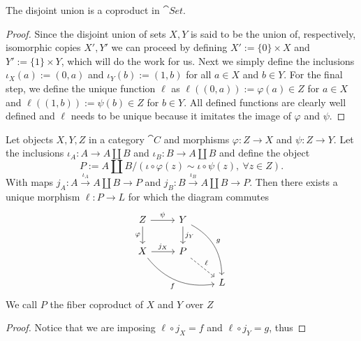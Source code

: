 \begin{proposition}
   The disjoint union is a coproduct in \(\cat{Set}\).
\end{proposition}

\begin{proof}
    Since the disjoint union of sets \(X, Y\) is said to be the union of,
    respectively, isomorphic copies \(X', Y'\) we can proceed by defining  \(X'
    := \{0\} \times X\) and \(Y' := \{1\} \times Y\), which will do the work
    for us. Next we simply define the inclusions \(\iota_X(a) := (0, a)\) and
    \(\iota_Y(b) := (1, b)\) for all \(a \in X\) and \(b \in Y\). For the final
    step, we define the unique function \(\ell\) as \(\ell((0,a)) := \varphi(a)
    \in Z\) for \(a \in X\) and \(\ell((1, b)) := \psi(b) \in Z\)  for \(b \in
    Y\). All defined functions are clearly well defined and \(\ell\) needs to be
    unique because it imitates the image of \(\varphi\) and \(\psi\).
\end{proof}

\begin{proposition}
   Let objects \(X, Y, Z\) in a category \(\cat C\) and morphisms \(\varphi : Z
   \to X\) and \(\psi : Z \to Y\). Let the inclusions \(\iota_A : A \to A \amalg
   B\) and  \(\iota_B: B \to A \amalg B\) and define the object 
    \[
       P := A \amalg B / (\iota \circ \varphi(z) \sim \iota \circ \psi(z),\
       \forall z \in Z).
   \] 
   With maps \(j_A : A \xrightarrow{\iota_A} A \amalg B \to P\) and  \(j_B : B
   \xrightarrow{\iota_B} A \amalg B \to P\). Then there exists a unique morphism
    \(\ell : P \to L\) for which the diagram commutes
     \[
       \begin{tikzcd}
         Z
         \ar[r, "\psi"]
         \ar[d, swap, "\varphi"]
           &Y
           \ar[d, "j_Y"]
           \ar[ddr, bend left, "g"]
             &\\
         X
         \ar[r, "j_X"]
         \ar[drr, bend right, swap, "f"]
           &P
           \ar[dr, dashed, "\ell"]
             &\\
           &
             &L
       \end{tikzcd}
    \] 
    We call \(P\) the fiber coproduct of \(X\) and \(Y\) over \(Z\)
\end{proposition}

\begin{proof}
   Notice that we are imposing \(\ell \circ j_X = f\) and \(\ell \circ j_Y =
   g\), thus  
\end{proof}

